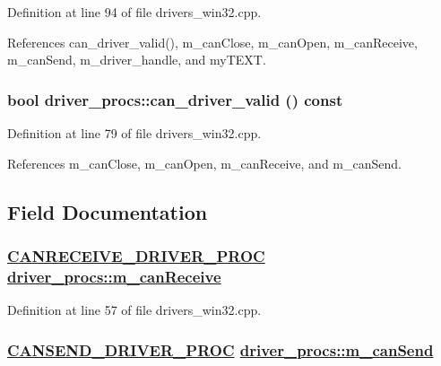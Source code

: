 Definition at line 94 of file drivers\_\-win32.cpp.

References can\_\-driver\_\-valid(), m\_\-can\-Close, m\_\-can\-Open, m\_\-can\-Receive, m\_\-can\-Send, m\_\-driver\_\-handle, and my\-TEXT.\hypertarget{classdriver__procs_a1e608bb39ab9183961b7ded9f27d193}{
\subsubsection[can\_\-driver\_\-valid]{\setlength{\rightskip}{0pt plus 5cm}bool driver\_\-procs::can\_\-driver\_\-valid () const}}
\label{classdriver__procs_a1e608bb39ab9183961b7ded9f27d193}




Definition at line 79 of file drivers\_\-win32.cpp.

References m\_\-can\-Close, m\_\-can\-Open, m\_\-can\-Receive, and m\_\-can\-Send.

\subsection{Field Documentation}
\hypertarget{classdriver__procs_ccb0ced5c9a7e1d9827639892db97917}{
\subsubsection[m\_\-canReceive]{\setlength{\rightskip}{0pt plus 5cm}\hyperlink{drivers__win32_8cpp_f0240c9d4c35205726e5ae81888327dd}{CANRECEIVE\_\-DRIVER\_\-PROC} \hyperlink{classdriver__procs_ccb0ced5c9a7e1d9827639892db97917}{driver\_\-procs::m\_\-can\-Receive}}}
\label{classdriver__procs_ccb0ced5c9a7e1d9827639892db97917}




Definition at line 57 of file drivers\_\-win32.cpp.\hypertarget{classdriver__procs_78808f630f632d281a6027f15c3a357f}{
\subsubsection[m\_\-canSend]{\setlength{\rightskip}{0pt plus 5cm}\hyperlink{drivers__win32_8cpp_90aa70ea2296b46e3fa52ff5e4bbc399}{CANSEND\_\-DRIVER\_\-PROC} \hyperlink{classdriver__procs_78808f630f632d281a6027f15c3a357f}{driver\_\-procs::m\_\-can\-Send}}}
\label{classdriver__procs_78808f630f632d281a6027f15c3a357f}




